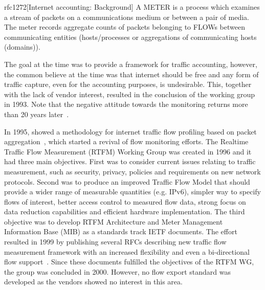 \begin{displaycquote}{rfc1272}[Internet accounting: Background]
A METER is a process which examines a stream of packets on a communications medium or between a pair of media. The meter records aggregate counts of packets belonging to FLOWs between communicating entities (hosts/processes or aggregations of communicating hosts (domains)).
\end{displaycquote}

The goal at the time was to provide a framework for traffic accounting, however, the common believe at the time was that internet should be free and any form of traffic capture, even for the accounting purposes, is undesirable. This, together with the lack of vendor interest, resulted in the conclusion of the working group in 1993. Note that the negative attitude towards the monitoring returns more than 20 years later~\cite{rfc7258}.

In 1995, \citeauthor{Claffy-1995-Parameterizable} showed a methodology for internet traffic flow profiling based on packet aggregation~\cite{Claffy-1995-Parameterizable}, which started a revival of flow monitoring efforts. The Realtime Traffic Flow  Measurement (RTFM) Working Group was created in 1996 and it had three main objectives. First was to consider current issues relating to traffic measurement, such as security, privacy, policies and requirements on new network protocols. Second was to produce an improved Traffic Flow Model that should provide a wider range of measurable quantities (e.g. IPv6), simpler way to specify flows of interest, better access control  to measured flow data, strong focus on data reduction capabilities and efficient hardware implementation. The third objective was to develop RTFM Architecture and Meter Management Information Base (MIB) as a standards track IETF documents. The effort resulted in 1999 by publishing several RFCs describing new traffic flow measurement framework with an increased flexibility and even a bi-directional flow support~\cite{rfc2722}. Since these documents fulfilled the objectives of the RTFM WG, the group was concluded in 2000. However, no flow export standard was developed as the vendors showed no interest in this area.

